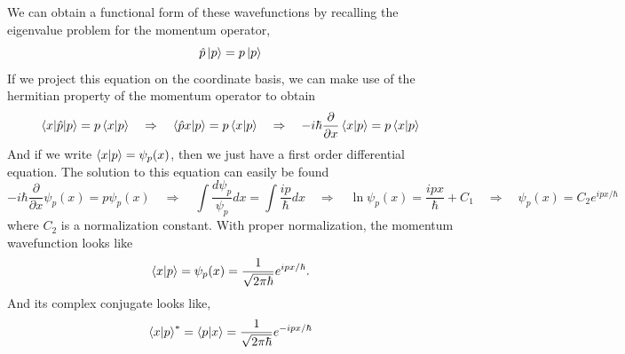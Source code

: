 \documentclass{article}
\newcommand{\be}{\begin{equation}}
\newcommand{\ee}{\end{equation}}
\begin{document}
We can obtain a functional form of these wavefunctions by recalling the eigenvalue problem for the momentum operator,
\be
  \hat{p} \ket{p} = p \ket{p}
\ee
If we project this equation on the coordinate basis, we can make use of the hermitian property of the momentum operator to obtain
\be
  \braket{x|\hat{p}|p} = p \braket{x|p} \quad \Rightarrow \quad \braket{\hat{p} x|p} =  p \braket{x|p} \quad \Rightarrow \quad -i \hbar \frac{\partial}{\partial x} \braket{x|p} = p \braket{x|p}
\ee
And if we write $\braket{x|p} = \psi_p(x)$, then we just have a first order differential equation.
The solution to this equation can easily be found
\be
  - i \hbar \frac{\partial}{\partial x} \psi_p(x) = p \psi_p(x) \quad \Rightarrow \quad \int \frac{d \psi_p}{\psi_p} dx = \int \frac{ip}{\hbar} dx \quad \Rightarrow \quad \ln \psi_p(x) = \frac{ipx}{\hbar} + C_1 \quad \Rightarrow \quad \psi_p(x) = C_2 e^{ipx/\hbar}
\ee
where $C_2$ is a normalization constant.
With proper normalization, the momentum wavefunction looks like
\be
  \braket{x|p} = \psi_p(x) = \frac{1}{\sqrt{2 \pi \hbar}} e^{ipx/\hbar} .
\ee
And its complex conjugate looks like,
\be
  \braket{x|p}^* = \braket{p|x} = \frac{1}{\sqrt{2 \pi \hbar}} e^{-ipx/\hbar}
\ee
\end{document}
